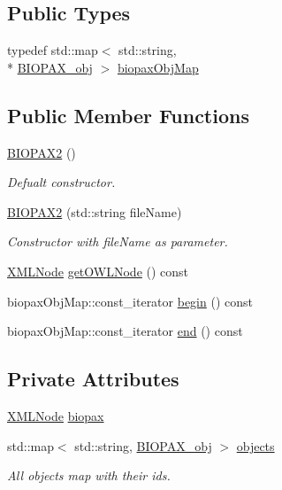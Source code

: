 \subsection*{Public Types}
\begin{DoxyCompactItemize}
\item 
typedef std\-::map$<$ std\-::string, \\*
\hyperlink{classunisys_1_1BIOPAX__obj}{B\-I\-O\-P\-A\-X\-\_\-obj} $>$ \hyperlink{classunisys_1_1BIOPAX2_afc4e3a4ce60303565431949e09527ba3}{biopax\-Obj\-Map}
\end{DoxyCompactItemize}
\subsection*{Public Member Functions}
\begin{DoxyCompactItemize}
\item 
\hyperlink{classunisys_1_1BIOPAX2_a05bdb19fae62f0a4826c6a83bf1cb63b}{B\-I\-O\-P\-A\-X2} ()
\begin{DoxyCompactList}\small\item\em Defualt constructor. \end{DoxyCompactList}\item 
\hyperlink{classunisys_1_1BIOPAX2_a012b1c9a86e129648cc67c7791703aa5}{B\-I\-O\-P\-A\-X2} (std\-::string file\-Name)
\begin{DoxyCompactList}\small\item\em Constructor with file\-Name as parameter. \end{DoxyCompactList}\item 
\hyperlink{structXMLNode}{X\-M\-L\-Node} \hyperlink{classunisys_1_1BIOPAX2_a355067caeb9981702d1c4a73ab5e9fa3}{get\-O\-W\-L\-Node} () const 
\item 
biopax\-Obj\-Map\-::const\-\_\-iterator \hyperlink{classunisys_1_1BIOPAX2_aeaa3de452a37cdf4850289f6d12eeb29}{begin} () const 
\item 
biopax\-Obj\-Map\-::const\-\_\-iterator \hyperlink{classunisys_1_1BIOPAX2_a6592a5950bb80975a0628d439813e1eb}{end} () const 
\end{DoxyCompactItemize}
\subsection*{Private Attributes}
\begin{DoxyCompactItemize}
\item 
\hyperlink{structXMLNode}{X\-M\-L\-Node} \hyperlink{classunisys_1_1BIOPAX2_adbffce99fec989b7e1318bffdb88697a}{biopax}
\item 
std\-::map$<$ std\-::string, \hyperlink{classunisys_1_1BIOPAX__obj}{B\-I\-O\-P\-A\-X\-\_\-obj} $>$ \hyperlink{classunisys_1_1BIOPAX2_aaa492741eb15232183400166a123f94d}{objects}
\begin{DoxyCompactList}\small\item\em All objects map with their ids. \end{DoxyCompactList}\end{DoxyCompactItemize}


